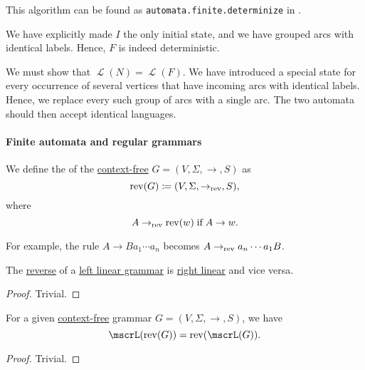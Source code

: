 \begin{comments}
  \item This algorithm can be found as \texttt{automata.finite.determinize} in \cite{code}.
\end{comments}
\begin{defproof}
  We have explicitly made \( I \) the only initial state, and we have grouped arcs with identical labels. Hence, \( F \) is indeed deterministic.

  We must show that \( \mscrL(N) = \mscrL(F) \). We have introduced a special state for every occurrence of several vertices that have incoming arcs with identical labels. Hence, we replace every such group of arcs with a single arc. The two automata should then accept identical languages.
\end{defproof}

\paragraph{Finite automata and regular grammars}

\begin{definition}\label{def:reverse_grammar}
  We define the  of the \hyperref[def:chomsky_hierarchy/context_free]{context-free} \( G = (V, \Sigma, \to, S) \) as
  \begin{equation*}
    \op{rev}(G) \coloneqq (V, \Sigma, \to_{\op{rev}}, S),
  \end{equation*}
  where
  \begin{equation*}
    A \to_{\op{rev}} \op{rev}(w) \T{if} A \to w.
  \end{equation*}
\end{definition}
\begin{comments}
  \item For example, the rule \( A \to Ba_1 \cdots a_n \) becomes \( A \to_{\op{rev}} a_n \cdots a_1 B \).
\end{comments}

\begin{proposition}\label{thm:reverse_linear_grammar}
  The \hyperref[def:reverse_grammar]{reverse} of a \hyperref[def:chomsky_hierarchy/regular]{left linear grammar} is \hyperref[def:chomsky_hierarchy/regular]{right linear} and vice versa.
\end{proposition}
\begin{proof}
  Trivial.
\end{proof}

\begin{proposition}\label{thm:reverse_grammar_language}
  For a given \hyperref[def:chomsky_hierarchy/context_free]{context-free} grammar \( G = (V, \Sigma, \to, S) \), we have
  \begin{equation*}
    \mscrL(\op{rev}(G)) = \op{rev}(\mscrL(G)).
  \end{equation*}
\end{proposition}
\begin{proof}
  Trivial.
\end{proof}

